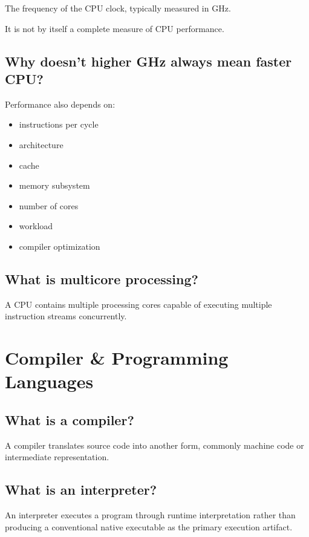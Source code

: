 The frequency of the CPU clock, typically measured in GHz.

It is not by itself a complete measure of CPU performance.

\medskip

\subsection{Why doesn't higher GHz always mean faster CPU?}

Performance also depends on:

\begin{itemize}
  \item instructions per cycle
  \item architecture
  \item cache
  \item memory subsystem
  \item number of cores
  \item workload
  \item compiler optimization
\end{itemize}

\medskip

\subsection{What is multicore processing?}

A CPU contains multiple processing cores capable of executing multiple instruction streams concurrently.

\medskip

\section{Compiler \& Programming Languages}

\subsection{What is a compiler?}

A compiler translates source code into another form, commonly machine code or intermediate representation.

\medskip

\subsection{What is an interpreter?}

An interpreter executes a program through runtime interpretation rather than producing a conventional native executable as the primary execution artifact.

